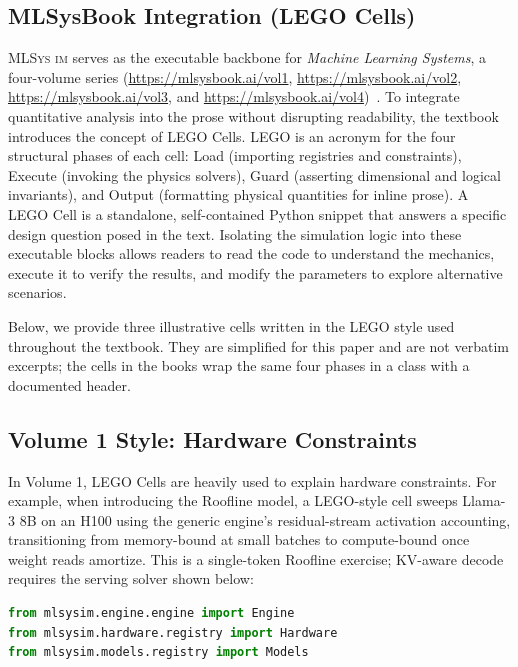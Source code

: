 \documentclass[10pt,twocolumn]{article}
\newcommand{\mlsysim}{\mbox{\textsc{MLSys}\,\textperiodcentered\,\textsc{im}}\xspace}
\begin{document}



\clearpage
\onecolumn
\begin{appendices}

\raggedbottom
\lstset{captionpos=t}
\section{MLSysBook Integration (LEGO Cells)}
\label{sec:appendix-mlsysbook}

\mlsysim serves as the executable backbone for \emph{Machine Learning Systems}, a four-volume series (\url{https://mlsysbook.ai/vol1}, \url{https://mlsysbook.ai/vol2}, \url{https://mlsysbook.ai/vol3}, and \url{https://mlsysbook.ai/vol4})~\citep{mlsysbook2025}. To integrate quantitative analysis into the prose without disrupting readability, the textbook introduces the concept of LEGO Cells. LEGO is an acronym for the four structural phases of each cell: Load (importing registries and constraints), Execute (invoking the physics solvers), Guard (asserting dimensional and logical invariants), and Output (formatting physical quantities for inline prose). A LEGO Cell is a standalone, self-contained Python snippet that answers a specific design question posed in the text. Isolating the simulation logic into these executable blocks allows readers to read the code to understand the mechanics, execute it to verify the results, and modify the parameters to explore alternative scenarios.

Below, we provide three illustrative cells written in the LEGO style used throughout the textbook. They are simplified for this paper and are not verbatim excerpts; the cells in the books wrap the same four phases in a class with a documented header.

\subsection{Volume 1 Style: Hardware Constraints}
In Volume 1, LEGO Cells are heavily used to explain hardware constraints. For example, when introducing the Roofline model, a LEGO-style cell sweeps Llama-3 8B on an H100 using the generic engine's residual-stream activation accounting, transitioning from memory-bound at small batches to compute-bound once weight reads amortize. This is a single-token Roofline exercise; KV-aware decode requires the serving solver shown below:

\noindent\begin{minipage}{\linewidth}
\begin{lstlisting}[language=Python, caption={\textbf{Illustrative LEGO-Style Cell: Roofline Analysis.} Sweeping batch size with the \texttt{Engine} shows the transition from memory-bound to compute-bound execution as weight reads amortize.}, label={lst:lego-vol1}]
from mlsysim.engine.engine import Engine
from mlsysim.hardware.registry import Hardware
from mlsysim.models.registry import Models


\end{lstlisting}
\end{minipage}
\end{appendices}
\end{document}

